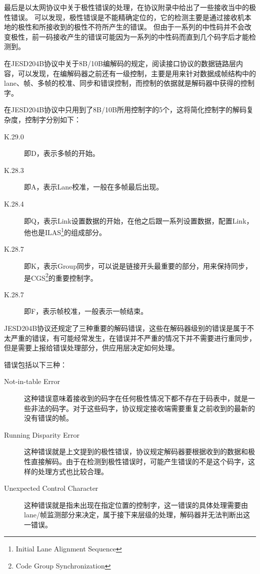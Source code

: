 \documentclass[UTF8]{ctexart}
\begin{document}
最后是以太网协议中关于极性错误的处理，在协议附录中给出了一些接收当中的极性错误。
可以发现，极性错误是不能精确定位的，它的检测主要是通过接收机本地的极性和所接收到的极性不符所产生的错误。
但由于一系列的中性码并不会改变极性，前一码接收产生的错误可能因为一系列的中性码而直到几个码字后才能检测到。

在JESD204B协议中关于8B/10B编解码的规定，阅读接口协议的数据链路层内容，可以发现，在编解码器之前还有一级控制，主要是用来针对数据成帧结构中的lane、帧、多帧的校准、同步和错误控制，而控制的依据就是解码器中获得的控制字。

在JESD204B协议中只用到了8B/10B所用控制字的5个，这将简化控制字的解码复杂度，控制字分别如下：

\begin{description}
\item[K.29.0] 即D，表示多帧的开始。
\item[K.28.3] 即A，表示Lane校准，一般在多帧最后出现。
\item[K.28.4] 即Q，表示Link设置数据的开始，在他之后跟一系列设置数据，配置Link，他也是ILAS\footnote{Initial Lane Alignment Sequence}的组成部分。
\item[K.28.7] 即K，表示Group同步，可以说是链接开头最重要的部分，用来保持同步，是CGS\footnote{Code Group Synchronization}的重要控制字。
\item[K.28.7] 即F，表示帧校准，一般表示一帧结束。
\end{description}

JESD204B协议还规定了三种重要的解码错误，这些在解码器级别的错误是属于不太严重的错误，有可能经常发生，在错误并不严重的情况下并不需要进行重同步，但是需要上报给错误处理部分，供应用层决定如何处理。

错误包括以下三种：

\begin{description}
\item[Not-in-table Error] 这种错误意味着接收到的码字在任何极性情况下都不存在于码表中，就是一些非法的码字。对于这些码字，协议规定接收端需要重复之前收到的最新的没有错误的帧。
\item[Running Disparity Error] 这种错误就是上文提到的极性错误，协议规定解码器要根据收到的数据和极性直接解码。由于在检测到极性错误时，可能产生错误的不是这个码字，这样的处理方式也比较合理。
\item[Unexpected Control Character] 这种错误就是指未出现在指定位置的控制字，这一错误的具体处理需要由lane/帧监测部分来决定，属于接下来层级的处理，解码器并无法判断出这一错误。
\end{description}
\end{document}
